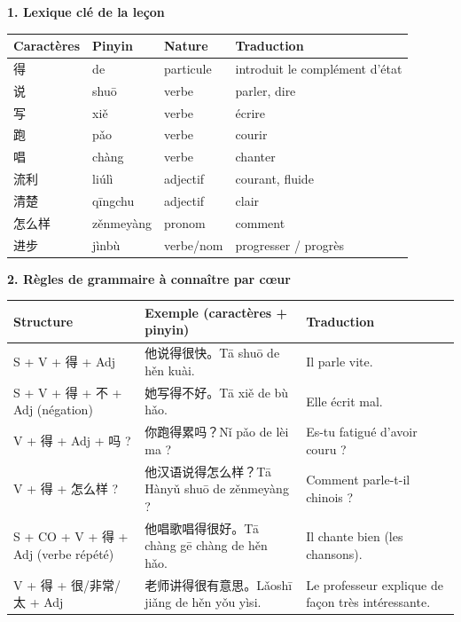 \documentclass[11pt]{article}
\begin{document}
\begin{bilan}
\textbf{1. Lexique clé de la leçon}
\begin{center}
\begin{tabularx}{\linewidth}{|X|X|X|X|}
\hline
\rowcolor{popblueL} Caractères & Pinyin & Nature & Traduction \\
\hline
得 & de & particule & introduit le complément d'état \\
\hline
说 & shuō & verbe & parler, dire \\
\hline
写 & xiě & verbe & écrire \\
\hline
跑 & pǎo & verbe & courir \\
\hline
唱 & chàng & verbe & chanter \\
\hline
流利 & liúlì & adjectif & courant, fluide \\
\hline
清楚 & qīngchu & adjectif & clair \\
\hline
怎么样 & zěnmeyàng & pronom & comment \\
\hline
进步 & jìnbù & verbe/nom & progresser / progrès \\
\hline
\end{tabularx}
\end{center}

\textbf{2. Règles de grammaire à connaître par cœur}
\begin{center}
\begin{tabularx}{\linewidth}{|X|X|X|}
\hline
\rowcolor{popblueL} Structure & Exemple (caractères + pinyin) & Traduction \\
\hline
S + V + 得 + Adj & 他说得很快。Tā shuō de hěn kuài. & Il parle vite. \\
\hline
S + V + 得 + 不 + Adj (négation) & 她写得不好。Tā xiě de bù hǎo. & Elle écrit mal. \\
\hline
V + 得 + Adj + 吗 ? & 你跑得累吗？Nǐ pǎo de lèi ma ? & Es-tu fatigué d'avoir couru ? \\
\hline
V + 得 + 怎么样 ? & 他汉语说得怎么样？Tā Hànyǔ shuō de zěnmeyàng ? & Comment parle-t-il chinois ? \\
\hline
S + CO + V + 得 + Adj (verbe répété) & 他唱歌唱得很好。Tā chàng gē chàng de hěn hǎo. & Il chante bien (les chansons). \\
\hline
V + 得 + 很/非常/太 + Adj & 老师讲得很有意思。Lǎoshī jiǎng de hěn yǒu yìsi. & Le professeur explique de façon très intéressante. \\
\hline
\end{tabularx}
\end{center}


\end{bilan}
\end{document}
